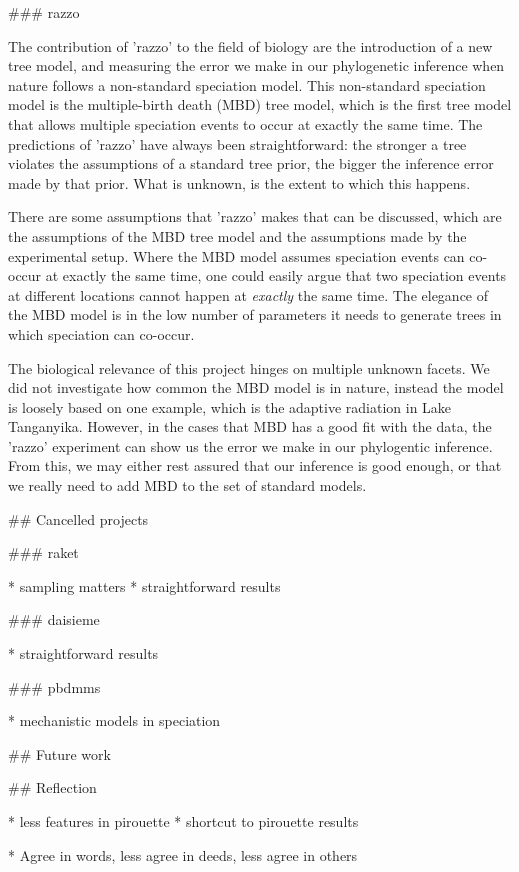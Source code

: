 ### razzo

The contribution of 'razzo' to the field of biology
are the introduction of a new tree model, 
and measuring the error we make in our phylogenetic inference when
nature follows a non-standard speciation model.
This non-standard speciation model is the multiple-birth death (MBD) tree model,
which is the first tree model that allows multiple speciation events to occur 
at exactly the same time.
The predictions of 'razzo' have always been straightforward:
the stronger a tree violates the assumptions of a standard tree
prior, the bigger the inference error made by that prior.
What is unknown, is the extent to which this happens.

There are some assumptions that 'razzo' makes that can be discussed,
which are the assumptions of the MBD tree model and the assumptions
made by the experimental setup.
Where the MBD model assumes speciation events can co-occur at exactly
the same time, one could easily argue that two speciation events
at different locations cannot happen at \emph{exactly} the same time.
The elegance of the MBD model is in the low number of parameters it
needs to generate trees in which speciation can co-occur.

The biological relevance of this project hinges on multiple unknown
facets. We did not investigate how common the MBD model is in nature,
instead the model is loosely based on one example, which is the 
adaptive radiation in Lake Tanganyika. However,
in the cases that MBD has a good fit with the data, 
the 'razzo' experiment can show us the error we make in our phylogentic 
inference. From this, we may either rest assured that our inference is good 
enough, or that we really need to add MBD to the set of standard models.

## Cancelled projects

### raket

 * sampling matters
 * straightforward results

### daisieme

 * straightforward results

### pbdmms

 * mechanistic models in speciation

## Future work

## Reflection

 * less features in pirouette
 * shortcut to pirouette results



 * Agree in words, less agree in deeds, less agree in others \cite{anderson2007normative}



